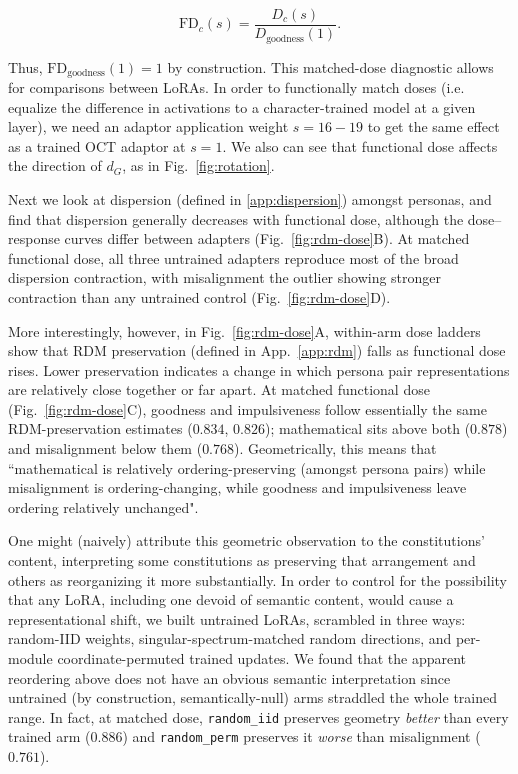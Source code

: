 \documentclass[11pt]{article}
\begin{document}
\begin{equation}
\mathrm{FD}_c(s)
=
\frac{D_c(s)}{D_{\mathrm{goodness}}(1)}.
\end{equation}

Thus, $\mathrm{FD}_{\mathrm{goodness}}(1)=1$ by construction.
This matched-dose diagnostic allows for comparisons between LoRAs. In order to functionally match doses (i.e. equalize the difference in activations to a character-trained model at a given layer), we need an adaptor application weight $s = 16-19$ to get the same effect as a trained OCT adaptor at $s = 1$. We also can see that functional dose affects the direction of $d_G$, as in Fig.~\ref{fig:rotation}. 

Next we look at dispersion (defined in \ref{app:dispersion}) amongst personas, and find that dispersion generally decreases with functional dose, although the dose–response curves differ between adapters (Fig.~\ref{fig:rdm-dose}B). At matched functional dose, all three untrained adapters reproduce most of the broad dispersion contraction, with misalignment the outlier showing stronger contraction than any untrained control (Fig.~\ref{fig:rdm-dose}D).

More interestingly, however, in Fig.~\ref{fig:rdm-dose}A, within-arm dose ladders show that RDM preservation (defined in App.~\ref{app:rdm}) falls as functional dose rises. Lower preservation indicates a change in which persona pair representations are relatively close together or far apart.  At matched functional dose (Fig.~\ref{fig:rdm-dose}C), goodness and impulsiveness follow essentially the same RDM-preservation estimates ($0.834$, $0.826$); mathematical sits above both ($0.878$) and misalignment below them ($0.768$). Geometrically, this means that ``mathematical is relatively ordering-preserving (amongst persona pairs) while misalignment is ordering-changing, while goodness and impulsiveness leave ordering relatively unchanged". 

One might (naively) attribute this geometric observation to the constitutions' content, interpreting some constitutions as preserving that arrangement and others as reorganizing it more substantially. In order to control for the possibility that any LoRA, including one devoid of semantic content, would cause a representational shift, we built untrained LoRAs, scrambled in three ways: random-IID weights, singular-spectrum-matched random directions, and per-module coordinate-permuted trained updates. We found that the apparent reordering above does not have an obvious semantic interpretation since untrained (by construction, semantically-null) arms straddled the whole trained range. In fact, at matched dose, \texttt{random\_iid} preserves geometry \emph{better} than every trained arm ($0.886$) and \texttt{random\_perm} preserves it \emph{worse} than misalignment ($0.761$).
\end{document}
